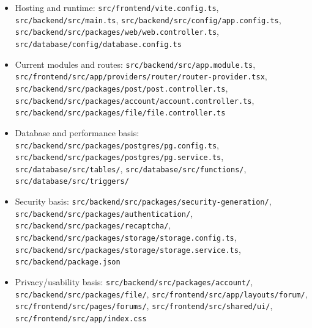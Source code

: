 \documentclass[12pt]{article}
\begin{document}
\begin{itemize}
\item Hosting and runtime: \texttt{src/frontend/vite.config.ts}, \texttt{src/backend/src/main.ts}, \texttt{src/backend/src/config/app.config.ts}, \texttt{src/backend/src/packages/web/web.controller.ts}, \texttt{src/database/config/database.config.ts}
\item Current modules and routes: \texttt{src/backend/src/app.module.ts}, \texttt{src/frontend/src/app/providers/router/router-provider.tsx}, \texttt{src/backend/src/packages/post/post.controller.ts}, \texttt{src/backend/src/packages/account/account.controller.ts}, \texttt{src/backend/src/packages/file/file.controller.ts}
\item Database and performance basis: \texttt{src/backend/src/packages/postgres/pg.config.ts}, \texttt{src/backend/src/packages/postgres/pg.service.ts}, \texttt{src/database/src/tables/}, \texttt{src/database/src/functions/}, \texttt{src/database/src/triggers/}
\item Security basis: \texttt{src/backend/src/packages/security-generation/}, \texttt{src/backend/src/packages/authentication/}, \texttt{src/backend/src/packages/recaptcha/}, \texttt{src/backend/src/packages/storage/storage.config.ts}, \texttt{src/backend/src/packages/storage/storage.service.ts}, \texttt{src/backend/package.json}
\item Privacy/usability basis: \texttt{src/backend/src/packages/account/}, \texttt{src/backend/src/packages/file/}, \texttt{src/frontend/src/app/layouts/forum/}, \texttt{src/frontend/src/pages/forums/}, \texttt{src/frontend/src/shared/ui/}, \texttt{src/frontend/src/app/index.css}
\end{itemize}
\par\medskip
\end{document}
